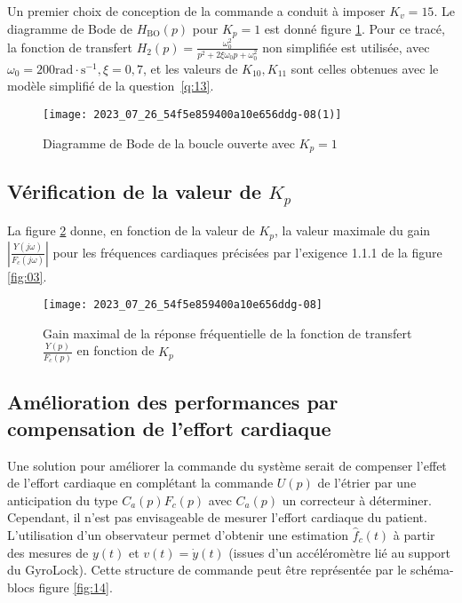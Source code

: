 Un premier choix de conception de la commande a conduit à imposer $K_{v}=15$. Le diagramme de Bode de $H_{\mathrm{BO}}(p)$ pour $K_{p}=1$ est donné figure \ref{fig:12}. Pour ce tracé, la fonction de transfert $H_{2}(p)=\frac{\omega_{0}^{2}}{p^{2}+2 \xi \omega_{0} p+\omega_{0}^{2}}$ non simplifiée est utilisée, avec $\omega_{0}=200 \mathrm{rad} \cdot \mathrm{s}^{-1}, \xi=0,7$, et les valeurs de $K_{10}, K_{11}$ sont celles obtenues avec le modèle simplifié de la question~\ref{q:13}.


\begin{figure}[!h]
\centering
\texttt{[image: 2023\_07\_26\_54f5e859400a10e656ddg-08(1)]}
\caption{\label{fig:12}Diagramme de Bode de la boucle ouverte avec $K_{p}=1$}
\end{figure}


\subsection{\label{sec:III.B} Vérification de la valeur de $K_{p}$}

La figure \ref{fig:13} donne, en fonction de la valeur de $K_{p}$, la valeur maximale du gain $\left|\frac{Y(j \omega)}{F_{c}(j \omega)}\right|$ pour les fréquences cardiaques précisées par l'exigence 1.1.1 de la figure \ref{fig:03}.


\begin{figure}[!h]
\centering
\texttt{[image: 2023\_07\_26\_54f5e859400a10e656ddg-08]}
\caption{\label{fig:13}Gain maximal de la réponse fréquentielle de la fonction de transfert $\frac{Y(p)}{F_{c}(p)}$ en fonction de $K_{p}$}
\end{figure}


\subsection{\label{sec:III.C} Amélioration des performances par compensation de l'effort cardiaque}
Une solution pour améliorer la commande du système serait de compenser l'effet de l'effort cardiaque en complétant la commande $U(p)$ de l'étrier par une anticipation du type $C_{a}(p) F_{c}(p)$ avec $C_{a}(p)$ un correcteur à déterminer. Cependant, il n'est pas envisageable de mesurer l'effort cardiaque du patient. L'utilisation d'un observateur permet d'obtenir une estimation $\hat{f}_{c}(t)$ à partir des mesures de $y(t)$ et $v(t)=\dot{y}(t)$ (issues d'un accéléromètre lié au support du GyroLock). Cette structure de commande peut être représentée par le schéma-blocs figure \ref{fig:14}.

